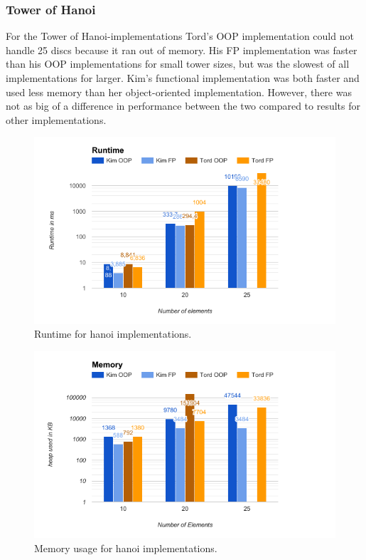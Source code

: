 \documentclass {article}
\begin{document}
\subsubsection{Tower of Hanoi}
For the Tower of Hanoi-implementations Tord's OOP implementation could not handle 25 discs because it ran out of memory. His FP implementation was faster than his OOP implementations for small tower sizes, but was the slowest of all implementations for larger. Kim's functional implementation was both faster and used less memory than her object-oriented implementation. However, there was not as big of a difference in performance between the two compared to results for other implementations.
 
\begin{figure}[H]
\includegraphics[width=\textwidth]{hanoi-runtime}

\caption{Runtime for hanoi implementations.}
\label{fig:hanoi-runtime}
\end{figure}

\begin{figure}[H]
\includegraphics[width=\textwidth]{hanoi-memory}

\caption{Memory usage for hanoi implementations.}
\label{fig:hanoi-memory}
\end{figure}
\end{document}
